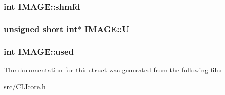 \subsubsection[{shmfd}]{\setlength{\rightskip}{0pt plus 5cm}int I\+M\+A\+G\+E\+::shmfd}\label{structIMAGE_aa1de16f9b739720f6de65389f63d8229}
\hypertarget{structIMAGE_a0e75d3dd1879fa0d0fa9caaa80a1074a}{}
\subsubsection[{U}]{\setlength{\rightskip}{0pt plus 5cm}unsigned short int$\ast$ I\+M\+A\+G\+E\+::\+U}\label{structIMAGE_a0e75d3dd1879fa0d0fa9caaa80a1074a}
\hypertarget{structIMAGE_aca4f71f11b37d19c782813e3be7dee49}{}
\subsubsection[{used}]{\setlength{\rightskip}{0pt plus 5cm}int I\+M\+A\+G\+E\+::used}\label{structIMAGE_aca4f71f11b37d19c782813e3be7dee49}


The documentation for this struct was generated from the following file\+:\begin{DoxyCompactItemize}
\item 
src/\hyperlink{CLIcore_8h}{C\+L\+Icore.\+h}\end{DoxyCompactItemize}
